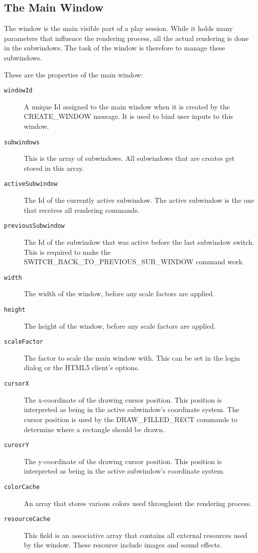 \documentclass{article}
\newcommand{\field}[1]{\textcolor{fieldColor}{\texttt{#1}}}
\begin{document}
\subsection{The Main Window}
The window is the main visible part of a play session. While it holds many parameters that influence the rendering process, all the actual rendering is done in the subwindows.
The task of the window is therefore to manage these subwindows.

These are the properties of the main window:
\begin{description}
\item [\field{windowId}] A unique Id assigned to the main window when it is created by the CREATE\_WINDOW message. It is used to bind user inputs to this window.
\item [\field{subwindows}] This is the array of subwindows. All subwindows that are creates get stored in this array.
\item [\field{activeSubwindow}] The Id of the currently active subwindow. The active subwindow is the one that receives all rendering commands.
\item [\field{previousSubwindow}] The Id of the subwindow that was active before the last subwindow switch. This is required to make the \\ SWITCH\_BACK\_TO\_PREVIOUS\_SUB\_WINDOW command work.
\item [\field{width}] The width of the window, before any scale factors are applied. 
\item [\field{height}] The height of the window, before any scale factors are applied.
\item [\field{scaleFactor}] The factor to scale the main window with. This can be set in the login dialog or the HTML5 client's options.
\item [\field{cursorX}] The x-coordinate of the drawing cursor position. This position is interpreted as being in the active subwindow's coordinate system. The cursor position is used by the DRAW\_FILLED\_RECT
commands to determine where a rectangle should be drawn.
\item [\field{curosrY}] The y-coordinate of the drawing cursor position. This position is interpreted as being in the active subwindow's coordinate system.
\item [\field{colorCache}] An array that stores various colors used throughout the rendering process.
\item [\field{resourceCache}] This field is an associative array that contains all external resources used by the window. These resource include images and sound effects.
\end{description}
\end{document}
